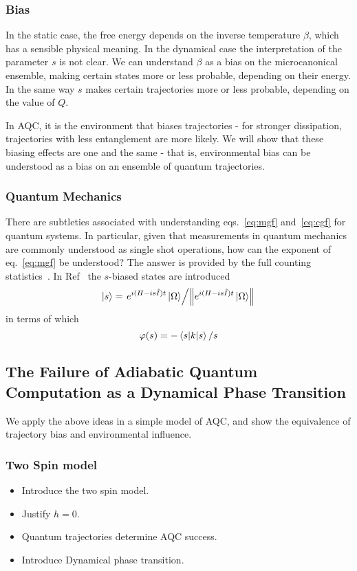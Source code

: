 \documentclass{article}
\begin{document}
\subsubsection{Bias}
%
In the static case, the free energy depends on the inverse temperature $\beta$, which has a sensible physical meaning. 
In the dynamical case the interpretation of the parameter $s$ is not clear. 
We can understand $\beta$ as a bias on the microcanonical ensemble, making certain states more or less probable, depending on their energy.
In the same way $s$ makes certain trajectories more or less probable, depending on the value of $Q$.

In AQC, it is the environment that biases trajectories - for stronger dissipation, trajectories with less entanglement are more likely. 
We will show that these biasing effects are one and the same - that is, environmental bias can be understood as a bias on an ensemble of quantum trajectories. 
%
\subsubsection{Quantum Mechanics}
%
There are subtleties associated with understanding eqs.~\ref{eq:mgf} and~\ref{eq:cgf} for quantum systems. 
In particular, given that measurements in quantum mechanics are commonly understood as single shot operations, how can the exponent of eq.~\ref{eq:mgf} be understood?
The answer is provided by the full counting statistics~\cite{Nazarov2001}.
In Ref~\cite{Hickey2013} the $s$-biased states are introduced
\begin{equation}
    \ket{s} = \flatfrac{e^{i(H-is\hat{I})t} \ket{\Omega}}{\norm{e^{i(H-is\hat{I})t} \ket{\Omega}}}
\end{equation}
in terms of which 
\begin{equation}
    \varphi(s) = -\ev{k}{s}/s
\end{equation}
\subsection{The Failure of Adiabatic Quantum Computation as a Dynamical Phase Transition}
We apply the above ideas in a simple model of AQC, and show the equivalence of trajectory bias and environmental influence.
%
\subsubsection{Two Spin model}
%
\begin{itemize}
    \item Introduce the two spin model.
    \item Justify $h=0$.
    \item Quantum trajectories determine AQC success.
    \item Introduce Dynamical phase transition.
\end{itemize}
%
\end{document}
